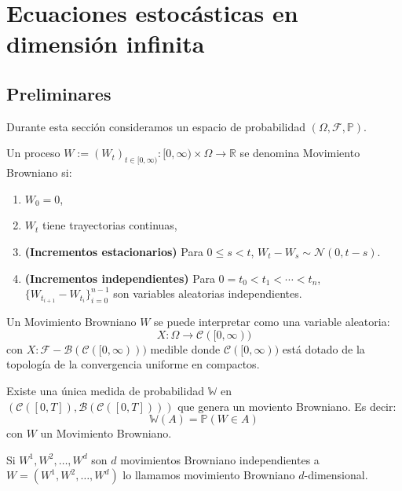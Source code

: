 \section{Ecuaciones estocásticas en dimensión infinita}

\subsection{Preliminares}

Durante esta sección consideramos un espacio de probabilidad $(\Omega, \mathcal{F}, \mathbb{P})$.

\begin{defn}
  Un proceso $W:=\left(W_t\right)_{t \in[0, \infty)}:[0, \infty) \times \Omega \rightarrow \mathbb{R}$ se denomina Movimiento Browniano si:
  \begin{enumerate}
    \item $W_0=0$,
    \item $W_t$ tiene trayectorias continuas,
    \item \textbf{(Incrementos estacionarios)} Para $0 \leq s < t$, $W_t - W_s \sim \mathcal{N}(0, t-s)$.
    \item \textbf{(Incrementos independientes)} Para $0 = t_0 < t_1 < \cdots < t_n $, $\big\{ W_{t_{i+1}} - W_{t_i} \big\}_{i=0}^{n-1}$ son variables aleatorias independientes.
  \end{enumerate}
\end{defn}

\begin{obs}[]
  Un Movimiento Browniano $W$ se puede interpretar como una variable aleatoria:
  \[
    X: \Omega \rightarrow \mathcal{C}([0 ,\infty))
  \]
  con $X: \mathcal{F}-\mathcal{B}(\mathcal{C}([0, \infty)))$ medible donde $\mathcal{C}([0, \infty))$ está dotado de la topología de la convergencia uniforme en compactos.
\end{obs}

\begin{teo}
  Existe una única medida de probabilidad $\mathbb{W}$ en $(\mathcal{C}([0, T]), \mathcal{B}(\mathcal{C}([0, T])))$ que genera un moviento Browniano. Es decir:
  \[
    \mathbb{W}\left( A \right) = \mathbb{P}\left( W \in A \right)
  \]
  con $W$ un Movimiento Browniano.
\end{teo}

\begin{defn}
  Si $W^1, W^2, \ldots, W^d$ son $d$ movimientos Browniano independientes a $W = (W^1, W^2, \ldots, W^d)$ lo llamamos movimiento Browniano $d$-dimensional.
\end{defn}

